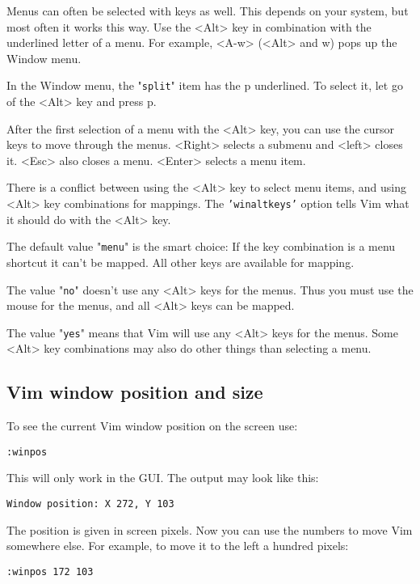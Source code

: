 Menus can often be selected with keys as well.
This depends on your system, but most often it works this way.
Use the <Alt> key in combination with the underlined letter of a menu.
For example, <A-w> (<Alt> and w) pops up the Window menu.

In the Window menu, the "\texttt{split}" item has the p underlined.
To select it, let go of the <Alt> key and press p.

After the first selection of a menu with the <Alt> key, you can use the cursor keys to move through the menus.
<Right> selects a submenu and <left> closes it.
<Esc> also closes a menu.
<Enter> selects a menu item.

There is a conflict between using the <Alt> key to select menu items, and using <Alt> key combinations for mappings.
The \texttt{'winaltkeys'} option tells Vim what it should do with the <Alt> key.

The default value "\texttt{menu}" is the smart choice: If the key combination is a menu shortcut it can't be mapped.
All other keys are available for mapping.

The value "\texttt{no}" doesn't use any <Alt> keys for the menus.
Thus you must use the mouse for the menus, and all <Alt> keys can be mapped.

The value "\texttt{yes}" means that Vim will use any <Alt> keys for the menus.
Some <Alt> key combinations may also do other things than selecting a menu.
\subsection{Vim window position and size}
To see the current Vim window position on the screen use:

\begin{Verbatim}[samepage=true]
 :winpos
\end{Verbatim}

This will only work in the GUI.
The output may look like this:

\begin{Verbatim}[samepage=true]
    Window position: X 272, Y 103 
\end{Verbatim}

The position is given in screen pixels.
Now you can use the numbers to move Vim somewhere else.
For example, to move it to the left a hundred pixels:

\begin{Verbatim}[samepage=true]
 :winpos 172 103
\end{Verbatim}
 
